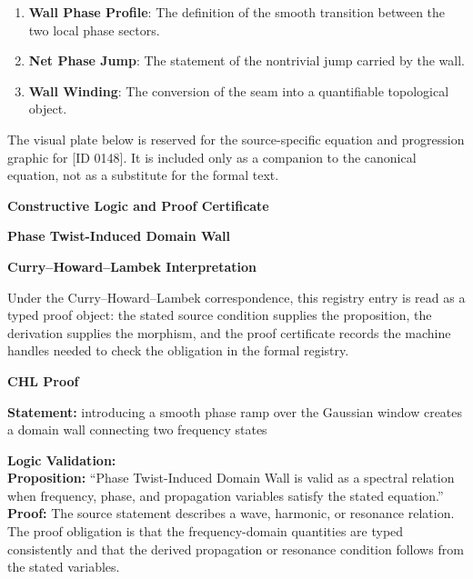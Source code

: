\begin{enumerate}[leftmargin=1.6em,itemsep=6pt,topsep=4pt]
\item \textbf{Wall Phase Profile}: The definition of the smooth transition between the two local phase sectors.
\item \textbf{Net Phase Jump}: The statement of the nontrivial jump carried by the wall.
\item \textbf{Wall Winding}: The conversion of the seam into a quantifiable topological object.
\end{enumerate}

\begingroup\footnotesize\sloppy
The visual plate below is reserved for the source-specific equation and progression graphic for [ID 0148]. It is included only as a companion to the canonical equation, not as a substitute for the formal text.
\par\endgroup
\ifTZPDarkEdition
{}
\fi

\clearpage
\begingroup\tzpsupportsetup
\noindent\textbf{\fontsize{10.8pt}{12.8pt}\selectfont [ID 0148] Constructive Logic and Proof Certificate}\par
\noindent\textbf{\fontsize{10pt}{12pt}\selectfont Phase Twist-Induced Domain Wall}\par
\vspace{0.45em}
\begingroup
\footnotesize
\setlength{\parskip}{0.22em}
\setlength{\parindent}{0pt}
\noindent\textbf{Curry--Howard--Lambek Interpretation}\par
Under the Curry--Howard--Lambek correspondence, this registry entry is read as a typed proof
object: the stated source condition supplies the proposition, the derivation supplies the
morphism, and the proof certificate records the machine handles needed to check the obligation
in the formal registry.

\vspace{0.45em}
\noindent\textbf{CHL Proof}\par
\textbf{Statement:} introducing a smooth phase ramp over the Gaussian window creates a domain wall
connecting two frequency states

\textbf{Logic Validation:}\\
\textbf{Proposition:} ``Phase Twist-Induced Domain Wall is valid as a spectral relation when frequency, phase,
and propagation variables satisfy the stated equation.''\\
\textbf{Proof:} The source statement describes a wave, harmonic, or resonance relation. The proof
obligation is that the frequency-domain quantities are typed consistently and that the
derived propagation or resonance condition follows from the stated variables.

